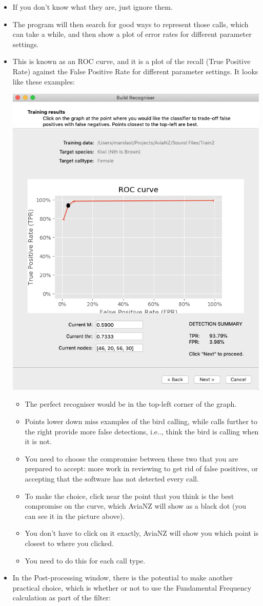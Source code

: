 \documentclass{article}
\begin{document}
\begin{itemize}
\item If you don't know what they are, just ignore them. 
\item The program will then search for good ways to represent those calls, which can take a while, and then show a plot of error rates for different parameter settings. 
\item This is known as an ROC curve, and it is a plot of the recall (True Positive Rate) against the False Positive Rate for different parameter settings. It looks like these examples:
\begin{center}
    \includegraphics[width=.4\textwidth]{Figs/Wizard_ROC}
\end{center}

\begin{itemize}
\item The perfect recogniser would be in the top-left corner of the graph. 
\item Points lower down miss examples of the bird calling, while calls further to the right provide more false detections, i.e.., think the bird is calling when it is not. 
\item You need to choose the compromise between these two that you are prepared to accept: more work in reviewing to get rid of false positives, or accepting that the software has not detected every call. 
\item To make the choice, click near the point that you think is the best compromise on the curve, which AviaNZ will show as a black dot (you can see it in the picture above). 
\item You don't have to click on it exactly, AviaNZ will show you which point is closest to where you clicked. 
\item You need to do this for each call type. 
\end{itemize}

\item In the Post-processing window, there is the potential to make another practical choice, which is whether or not to use the Fundamental Frequency calculation as part of the filter:


\end{itemize}
\end{document}
